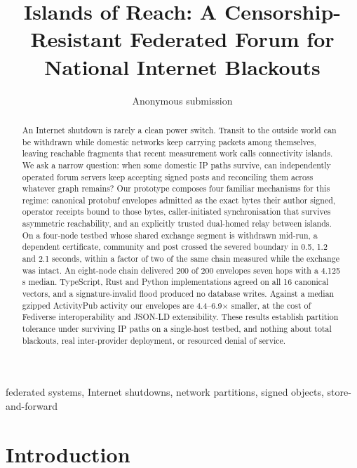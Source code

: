 \documentclass[conference,a4paper]{IEEEtran}
\begin{document}
\title{Islands of Reach: A Censorship-Resistant Federated Forum for
National Internet Blackouts}

\author{Anonymous submission}

\maketitle

\begin{abstract}
  An Internet shutdown is rarely a clean power switch. Transit to the outside world can be withdrawn while domestic networks keep carrying packets among themselves, leaving reachable fragments that recent measurement work calls connectivity islands. We ask a narrow question: when some domestic IP paths survive, can independently operated forum servers keep accepting signed posts and reconciling them across whatever graph remains? Our prototype composes four familiar mechanisms for this regime: canonical protobuf envelopes admitted as the exact bytes their author signed, operator receipts bound to those bytes, caller-initiated synchronisation that survives asymmetric reachability, and an explicitly trusted dual-homed relay between islands. On a four-node testbed whose shared exchange segment is withdrawn mid-run, a dependent certificate, community and post crossed the severed boundary in 0.5, 1.2 and 2.1 seconds, within a factor of two of the same chain measured while the exchange was intact. An eight-node chain delivered 200 of 200 envelopes seven hops with a 4.125\,s median. TypeScript, Rust and Python implementations agreed on all 16 canonical vectors, and a signature-invalid flood produced no database writes. Against a median gzipped ActivityPub activity our envelopes are 4.4--6.9$\times$ smaller, at the cost of Fediverse interoperability and JSON-LD extensibility. These results establish partition tolerance under surviving IP paths on a single-host testbed, and nothing about total blackouts, real inter-provider deployment, or resourced denial of service.
\end{abstract}

\begin{IEEEkeywords}
  federated systems, Internet shutdowns, network partitions, signed objects, store-and-forward
\end{IEEEkeywords}

\section{Introduction}
\end{document}
